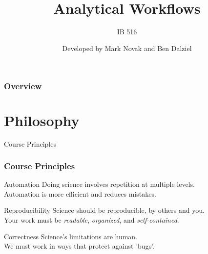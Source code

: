\documentclass{beamer}
\title[Analytical Workflows] %
{Analytical Workflows}
\subtitle{IB 516}
\author[] %
{Developed by Mark Novak and Ben Dalziel}
\institute[] %
{
  \inst{}%
  Dept. of Integrative Biology\\
  Oregon State University
}
\date[] %
{}
\begin{document}
\frame{\titlepage}

\begin{frame}
    \frametitle{Overview}
    \tableofcontents
\end{frame}


\section{Philosophy}


\begin{frame}{Course Principles}

    \frametitle{Course Principles}

        \begin{block}{Automation}
            Doing science involves repetition at multiple levels.\\Automation is more efficient and reduces mistakes.
        \end{block}

        \begin{block}{Reproducibility}
            Science should be reproducible, by others and you.\\Your work must be \emph{readable}, \emph{organized}, and \emph{self-contained}.
        \end{block}

        \begin{block}{Correctness}
            Science's limitations are human. \\We must work in ways that protect against 'bugs'.
        \end{block}


\end{frame}
\end{document}
